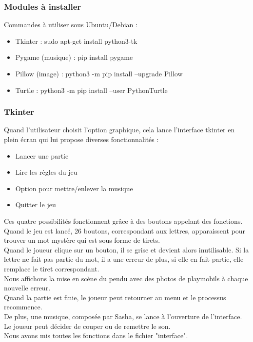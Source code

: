 \documentclass[french,10pt,a4paper]{article}	%
\begin{document}
	
	\subsubsection{Modules à installer}
	
	Commandes à utiliser sous Ubuntu/Debian :
	\begin{itemize}
	\item Tkinter : sudo apt-get install python3-tk	%
	\item Pygame (musique) : pip install pygame		%
	\item Pillow (image) : python3 -m pip install --upgrade Pillow %
	\item Turtle : python3 -m pip install --user PythonTurtle %
	\end{itemize}
	
	
		\subsubsection{Tkinter}
		
		
		\label{tk} Quand l'utilisateur choisit l'option graphique, cela lance l'interface tkinter en plein écran qui lui propose diverses fonctionnalités : %
		
		\begin{itemize}
		\item Lancer une partie
		\item Lire les règles du jeu
		\item Option pour mettre/enlever la musique
		\item Quitter le jeu
		\end{itemize}
		
		Ces quatre possibilités fonctionnent grâce à des boutons appelant des fonctions. \\
		Quand le jeu est lancé, 26 boutons, correspondant aux lettres, apparaissent pour trouver un mot mystère qui est sous forme de tirets. \\
		Quand le joueur clique sur un bouton, il se grise et devient alors inutilisable. Si la lettre ne fait pas partie du mot, il a une erreur de plus, si elle en fait partie, elle remplace le tiret correspondant.\\
		Nous affichons la mise en scène du pendu avec des photos de playmobils à chaque nouvelle erreur. \\
		Quand la partie est finie, le joueur peut retourner au menu et le processus recommence.\\
		De plus, une musique, composée par Sasha, se lance à l'ouverture de l'interface. Le joueur peut décider de couper ou de remettre le son. \\
		Nous avons mis toutes les fonctions dans le fichier "interface".
		
\end{document}
